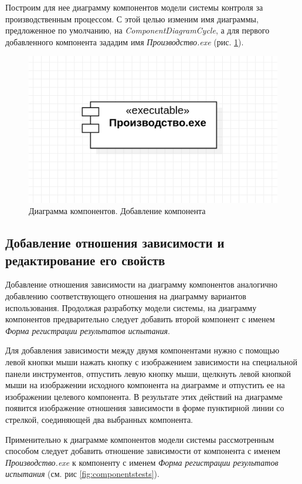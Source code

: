 \documentclass[a4paper,12pt]{extreport}
\begin{document}
Построим для нее диаграмму компонентов модели системы контроля за производственным процессом. С этой целью изменим имя диаграммы, предложенное по умолчанию, на \textit{ComponentDiagramCycle}, а для первого добавленного компонента зададим имя \textit{Производство.exe} (рис. \ref{fig:componentsmain}).

\begin{figure}[h!]
	\centering
	\includegraphics[width=0.5\linewidth]{images/componentsmain}
	\caption{Диаграмма компонентов. Добавление компонента}
	\label{fig:componentsmain}
\end{figure}
\subsection*{Добавление отношения зависимости и редактирование его свойств}
Добавление отношения зависимости на диаграмму компонентов аналогично добавлению соответствующего отношения на диаграмму вариантов использования. Продолжая разработку модели системы, на диаграмму компонентов предварительно следует добавить второй компонент с именем \textit{Форма регистрации результатов испытания}. 

Для добавления зависимости между двумя компонентами нужно с помощью левой кнопки мыши нажать кнопку с изображением зависимости на специальной панели инструментов, отпустить левую кнопку мыши, щелкнуть левой кнопкой мыши на изображении исходного компонента на диаграмме и отпустить ее на изображении целевого компонента. В результате этих действий на диаграмме появится изображение отношения зависимости в форме пунктирной линии со стрелкой, соединяющей два выбранных компонента.

Применительно к диаграмме компонентов модели системы рассмотренным способом следует добавить отношение зависимости от компонента с именем \textit{Производство.exe} к компоненту с именем \textit{Форма регистрации результатов испытания} (см. рис \ref{fig:componentstests}).
\end{document}
